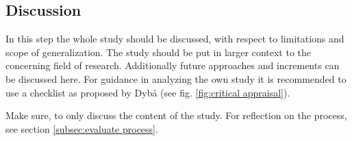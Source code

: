 
\subsection{Discussion}
\label{subsec:discussion}
In this step the whole study should be discussed, with respect to limitations and scope of generalization. The study should be put in larger context to the concerning field of research. Additionally future approaches and increments can be discussed here. For guidance in analyzing the own study it is recommended to use a checklist as proposed by Dyb{\aa} \etal (see fig. \ref{fig:critical appraisal}).

Make sure, to only discuss the content of the study. For reflection on the process, see section \ref{subsec:evaluate process}.